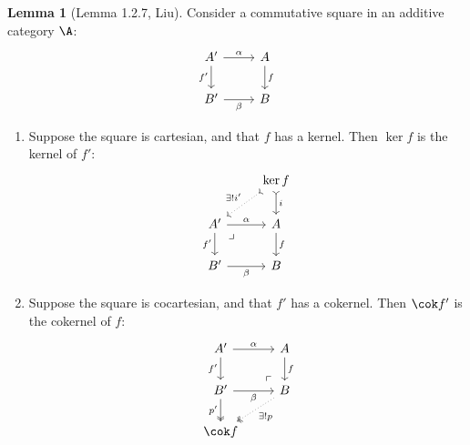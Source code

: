 \documentclass[12pt]{amsart}
\theoremstyle{definition}
\newtheorem{lemma}{Lemma}
\begin{document}
\begin{lemma}[Lemma 1.2.7, Liu]
  Consider a commutative square in an additive category $\A$:
  \[
    \begin{tikzcd}
      A'\ar[r,"\alpha"]\ar[d,"f'"'] & A\ar[d,"f"] \\
      B'\ar[r,"\beta"'] & B
    \end{tikzcd}
  \] 
  \begin{enumerate}[label=(\alph*)]
    \item Suppose the square is cartesian, and that $f$ has a kernel.
      Then $\ker f$ is the kernel of $f'$:
      \[
        \begin{tikzcd}
          &\ker f\ar[dl,dotted,tail,"\exists!i'"']\ar[d,tail,"i"] \\
          A'\ar[r,"\alpha"]\ar[d,"f'"'] \ar[dr,phantom, very near start, "\lrcorner"]& A\ar[d,"f"] \\
          B'\ar[r,"\beta"'] & B
        \end{tikzcd}
      \] 
    \item Suppose the square is cocartesian, and that $f'$ has a cokernel.
      Then $\cok f'$ is the cokernel of $f$:
      \[
        \begin{tikzcd}
          A'\ar[r,"\alpha"]\ar[d,"f'"'] & A\ar[d,"f"] \\
          B'\ar[r,"\beta"']\ar[d,twoheadrightarrow,"p'"'] & B\ar[dl,dotted,twoheadrightarrow,"\exists!p"]\ar[ul,phantom, very near start, "\ulcorner"] \\
          \cok f
        \end{tikzcd}
      \] 
  \end{enumerate}
\end{lemma}
\end{document}
